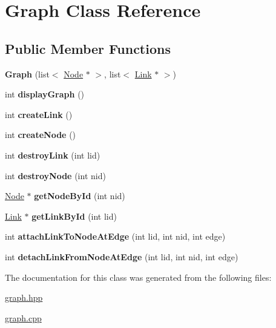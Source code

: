 \hypertarget{classGraph}{\section{Graph Class Reference}
\label{classGraph}
}
\subsection*{Public Member Functions}
\begin{DoxyCompactItemize}
\item 
\hypertarget{classGraph_ad16518c5057fefb3bca6cec54ddfc638}{{\bfseries Graph} (list$<$ \hyperlink{classNode}{Node} $\ast$ $>$, list$<$ \hyperlink{classLink}{Link} $\ast$ $>$)}\label{classGraph_ad16518c5057fefb3bca6cec54ddfc638}

\item 
\hypertarget{classGraph_a380c0e9b7bd2ad67e66d09ca2e9617c1}{int {\bfseries display\-Graph} ()}\label{classGraph_a380c0e9b7bd2ad67e66d09ca2e9617c1}

\item 
\hypertarget{classGraph_ab99fd82fc61e4ef1545bbe373b086ad0}{int {\bfseries create\-Link} ()}\label{classGraph_ab99fd82fc61e4ef1545bbe373b086ad0}

\item 
\hypertarget{classGraph_a4a5d7946ad3ae60e209528cff0c2b040}{int {\bfseries create\-Node} ()}\label{classGraph_a4a5d7946ad3ae60e209528cff0c2b040}

\item 
\hypertarget{classGraph_aeed286fdbecaeaa1dda9025020d277bb}{int {\bfseries destroy\-Link} (int lid)}\label{classGraph_aeed286fdbecaeaa1dda9025020d277bb}

\item 
\hypertarget{classGraph_a92ceb30bef1546092fd8ad644d19c708}{int {\bfseries destroy\-Node} (int nid)}\label{classGraph_a92ceb30bef1546092fd8ad644d19c708}

\item 
\hypertarget{classGraph_a19151ebc59fe3763e975a8b9efd11b97}{\hyperlink{classNode}{Node} $\ast$ {\bfseries get\-Node\-By\-Id} (int nid)}\label{classGraph_a19151ebc59fe3763e975a8b9efd11b97}

\item 
\hypertarget{classGraph_a67c51272c1b9abc3f7a7990a9b69fb21}{\hyperlink{classLink}{Link} $\ast$ {\bfseries get\-Link\-By\-Id} (int lid)}\label{classGraph_a67c51272c1b9abc3f7a7990a9b69fb21}

\item 
\hypertarget{classGraph_abb7ea2ae26c56a78993b16fc59eed565}{int {\bfseries attach\-Link\-To\-Node\-At\-Edge} (int lid, int nid, int edge)}\label{classGraph_abb7ea2ae26c56a78993b16fc59eed565}

\item 
\hypertarget{classGraph_a63da378eba2a985502ed63fb4c93b342}{int {\bfseries detach\-Link\-From\-Node\-At\-Edge} (int lid, int nid, int edge)}\label{classGraph_a63da378eba2a985502ed63fb4c93b342}

\end{DoxyCompactItemize}


The documentation for this class was generated from the following files\-:\begin{DoxyCompactItemize}
\item 
\hyperlink{graph_8hpp}{graph.\-hpp}\item 
\hyperlink{graph_8cpp}{graph.\-cpp}\end{DoxyCompactItemize}
